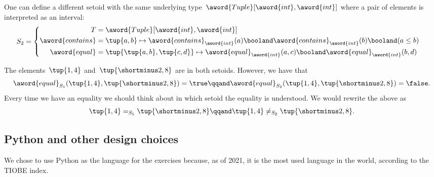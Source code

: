 One can define a different setoid with the same underlying type~$\aword{Tuple}[\aword{int}, \aword{int}]$ where a pair of elements is interpreted as an interval:
\begin{equation}
    S_2 =
    \begin{cases}
        \begin{aligned}
            T                & = \aword{Tuple}[\aword{int}, \aword{int}] \\
            \aword{contains} & = \tup{a,b} \mapsto
            \aword{contains}_{\aword{int}}(a)
            \booland
            \aword{contains}_{\aword{int}}(b)
            \booland
            (a\leq b) \\
            \aword{equal}    & = \tup{\tup{a,b}, \tup{c,d}}
            \mapsto
            \aword{equal}_{\aword{int}}(a,c)
            \booland
            \aword{equal}_{\aword{int}}(b,d)
        \end{aligned}
    \end{cases}
\end{equation}

The elements~$\tup{1,4}$ and~$\tup{\shortminus 2, 8}$ are in both setoids.
However, we have that
\begin{equation}
    \aword{equal}_{S_1} (\tup{1,4}, \tup{\shortminus 2, 8}) = \true
    \qqand
    \aword{equal}_{S_2} (\tup{1,4}, \tup{\shortminus 2, 8}) = \false .
\end{equation}
Every time we have an equality we should think about in which setoid the equality is understood.
We would rewrite the above as
\begin{equation}
    \tup{1,4} =_{S_1} \tup{ \shortminus 2, 8}
    \qqand
    \tup{1,4} \neq_{S_2} \tup{\shortminus 2, 8}.
\end{equation}

\subsection{Python and other design choices}

We chose to use Python as the language for the exercises because, as of 2021, it is the most used language in the world, according to the TIOBE index.

